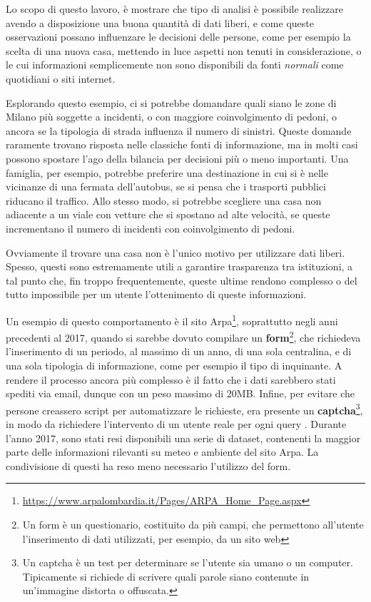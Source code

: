\documentclass[a4paper,12pt]{report}
\newcommand{\quotestyle}[1]{\textit{#1}}
\newcommand{\skipline}{\vspace{0.2in}}
\begin{document}

Lo scopo di questo lavoro, è mostrare che tipo di analisi è possibile realizzare 
avendo a disposizione una buona quantità di dati liberi, e come queste osservazioni possano 
influenzare le decisioni delle persone, come per esempio la scelta di una nuova casa, 
mettendo in luce aspetti non tenuti in considerazione, o le cui informazioni semplicemente 
non sono disponibili da fonti \quotestyle{normali} come quotidiani o siti internet.

Esplorando questo esempio, ci si potrebbe domandare quali siano le zone 
di Milano più soggette a incidenti, o con maggiore coinvolgimento di pedoni, 
o ancora se la tipologia di strada influenza il numero di sinistri. 
Queste domande raramente trovano risposta nelle classiche fonti di informazione, 
ma in molti casi possono spostare l'ago della bilancia per decisioni più o meno 
importanti.
Una famiglia, per esempio, potrebbe preferire una destinazione in cui si è nelle 
vicinanze di una fermata dell'autobus, se si pensa che i trasporti pubblici riducano 
il traffico. 
Allo stesso modo, si potrebbe scegliere una casa non adiacente 
a un viale con vetture che si spostano ad alte velocità, se queste incrementano 
il numero di incidenti con coinvolgimento di pedoni.

\skipline
Ovviamente il trovare una casa non è l'unico motivo per utilizzare dati liberi. 
Spesso, questi sono estremamente utili a garantire trasparenza tra istituzioni, 
a tal punto che, fin troppo frequentemente, queste ultime rendono complesso o 
del tutto impossibile per un utente l'ottenimento di queste informazioni.

Un esempio di questo comportamento è il sito 
Arpa\footnote{\url{https://www.arpalombardia.it/Pages/ARPA_Home_Page.aspx}}, 
soprattutto negli anni precedenti al 2017, quando si sarebbe dovuto compilare un 
\textbf{form}\footnote{Un form è un questionario, costituito da più campi, che 
permettono all'utente l'inserimento di dati utilizzati, per esempio, da un sito web}, 
che richiedeva l'inserimento di un periodo, al massimo di un anno, di una sola 
centralina, e di una sola tipologia di informazione, come per esempio il tipo di inquinante. 
A rendere il processo ancora più complesso è il fatto che i dati sarebbero stati 
spediti via email, dunque con un peso massimo di 20MB.
Infine, per evitare che persone creassero script per automatizzare le richieste, 
era presente un \textbf{captcha}\footnote{Un captcha è un test per determinare se l'utente 
sia umano o un computer. Tipicamente si richiede di scrivere quali parole siano 
contenute in un'immagine distorta o offuscata.}, in modo da richiedere l'intervento 
di un utente reale per ogni query \cite{TRENTINI:1}.
Durante l'anno 2017, sono stati resi disponibili una serie di dataset, contenenti la maggior 
parte delle informazioni rilevanti su meteo e ambiente del sito Arpa. 
La condivisione di questi ha reso meno necessario l'utilizzo del form.
\end{document}

